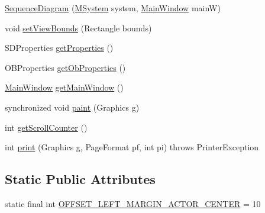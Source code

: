 \begin{DoxyCompactItemize}
\item 
\hyperlink{classorg_1_1tzi_1_1use_1_1gui_1_1views_1_1diagrams_1_1behavior_1_1sequencediagram_1_1_sequence_diagram_a8f90b89423fee86b996a1ffd5bbac0e8}{Sequence\-Diagram} (\hyperlink{classorg_1_1tzi_1_1use_1_1uml_1_1sys_1_1_m_system}{M\-System} system, \hyperlink{classorg_1_1tzi_1_1use_1_1gui_1_1main_1_1_main_window}{Main\-Window} main\-W)
\item 
void \hyperlink{classorg_1_1tzi_1_1use_1_1gui_1_1views_1_1diagrams_1_1behavior_1_1sequencediagram_1_1_sequence_diagram_a5d37da654d8d2aabd8b2cb666ebe2f06}{set\-View\-Bounds} (Rectangle bounds)
\item 
S\-D\-Properties \hyperlink{classorg_1_1tzi_1_1use_1_1gui_1_1views_1_1diagrams_1_1behavior_1_1sequencediagram_1_1_sequence_diagram_a660615b106ae4940ca02952508d7caf0}{get\-Properties} ()
\item 
O\-B\-Properties \hyperlink{classorg_1_1tzi_1_1use_1_1gui_1_1views_1_1diagrams_1_1behavior_1_1sequencediagram_1_1_sequence_diagram_a5749eccd4a725f30bcb08bdf1904952f}{get\-Ob\-Properties} ()
\item 
\hyperlink{classorg_1_1tzi_1_1use_1_1gui_1_1main_1_1_main_window}{Main\-Window} \hyperlink{classorg_1_1tzi_1_1use_1_1gui_1_1views_1_1diagrams_1_1behavior_1_1sequencediagram_1_1_sequence_diagram_a85ed5ef59cace36ee5b8a08bbc3b92ed}{get\-Main\-Window} ()
\item 
synchronized void \hyperlink{classorg_1_1tzi_1_1use_1_1gui_1_1views_1_1diagrams_1_1behavior_1_1sequencediagram_1_1_sequence_diagram_a4f3ad0a1ec4e9d49df81e8f11ceb06bf}{paint} (Graphics g)
\item 
int \hyperlink{classorg_1_1tzi_1_1use_1_1gui_1_1views_1_1diagrams_1_1behavior_1_1sequencediagram_1_1_sequence_diagram_a18f6cf499f8ca9fd0668bac10100b2e1}{get\-Scroll\-Counter} ()
\item 
int \hyperlink{classorg_1_1tzi_1_1use_1_1gui_1_1views_1_1diagrams_1_1behavior_1_1sequencediagram_1_1_sequence_diagram_a06fdd8bcdc187d93f056b2fe7b5fc17f}{print} (Graphics g, Page\-Format pf, int pi)  throws Printer\-Exception 
\end{DoxyCompactItemize}
\subsection*{Static Public Attributes}
\begin{DoxyCompactItemize}
\item 
static final int \hyperlink{classorg_1_1tzi_1_1use_1_1gui_1_1views_1_1diagrams_1_1behavior_1_1sequencediagram_1_1_sequence_diagram_a8755f9a3f30dcbd41c47d5bd0b2645eb}{O\-F\-F\-S\-E\-T\-\_\-\-L\-E\-F\-T\-\_\-\-M\-A\-R\-G\-I\-N\-\_\-\-A\-C\-T\-O\-R\-\_\-\-C\-E\-N\-T\-E\-R} = 10
\end{DoxyCompactItemize}


